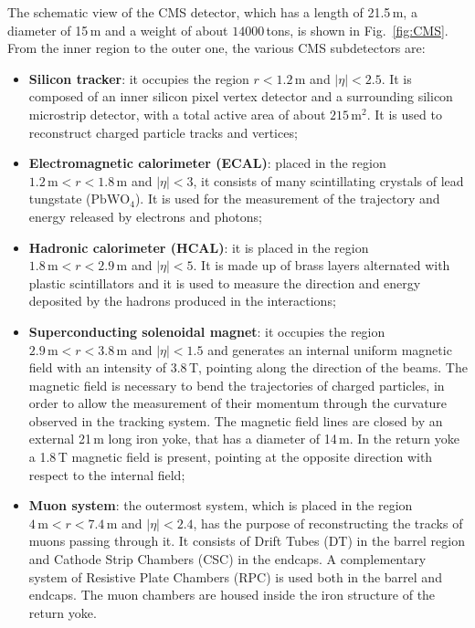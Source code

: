 The schematic view of the CMS detector, which has a length of 21.5\,m, a diameter of 15\,m and a weight of about $14000$\,tons, is shown in Fig.~\ref{fig:CMS}. From the inner region to the outer one, the various CMS subdetectors are:
\begin{itemize}
\item {\bf Silicon tracker}: it occupies the region $r < 1.2$\,m and $|\eta|<2.5$. It is composed of an inner silicon pixel vertex detector and a surrounding silicon microstrip detector, with a total active area of about $215\,\mathrm{m^2}$. It is used to reconstruct charged particle tracks and vertices;
\item {\bf Electromagnetic calorimeter (ECAL)}: placed in the region $1.2\,\mathrm{m} < r < 1.8\,\mathrm{m}$ and $|\eta|<3$, it consists of many scintillating crystals of lead tungstate ($\mathrm{PbWO_4}$). It is used for the measurement of the trajectory and energy released by electrons and photons;
\item {\bf Hadronic calorimeter (HCAL)}: it is placed in the region $1.8\,\mathrm{m} < r < 2.9\,\mathrm{m}$ and $|\eta|<5$. It is made up of brass layers alternated with plastic scintillators and it is used to measure the direction and energy deposited by the hadrons produced in the interactions;
\item {\bf Superconducting solenoidal magnet}: it occupies the region $2.9\,\mathrm{m} < r < 3.8\,\mathrm{m}$ and $|\eta|<1.5$ and generates an internal uniform magnetic field with an intensity of 3.8\,T, pointing along the direction of the beams. The magnetic field is necessary to bend the trajectories of charged particles, in order to allow the measurement of their momentum through the curvature observed in the tracking system. The magnetic field lines are closed by an external 21\,m long iron yoke, that has a diameter of 14\,m. In the return yoke a 1.8\,T magnetic field is present, pointing at the opposite direction with respect to the internal field;
\item {\bf Muon system}: the outermost system, which is placed in the region $4\,\mathrm{m} < r < 7.4\,\mathrm{m}$ and $|\eta|<2.4$, has the purpose of reconstructing the tracks of muons passing through it. It consists of Drift Tubes (DT) in the barrel region and Cathode Strip Chambers (CSC) in the endcaps. A complementary system of Resistive Plate Chambers (RPC) is used both in the barrel and endcaps. The muon chambers are housed inside the iron structure of the return yoke.
\end{itemize}

